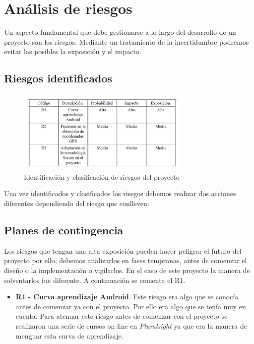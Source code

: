 \section{Análisis de riesgos}

Un aspecto fundamental que debe gestionarse a lo largo del desarrollo de un proyecto
son los riesgos. Mediante un tratamiento de la incertidumbre podremos evitar
las posibles la exposición y el impacto.

\subsection{Riesgos identificados}
\begin{figure}[H]
		\centering
		\includegraphics[width=0.75\textwidth] {riesgos.png}
		\caption{Identificación y clasificación de riesgos del proyecto }\label{fig:riesgos}
	\end{figure}
	
	
Una vez identificados y clasificados los riesgos debemos realizar dos acciones diferentes dependiendo del riesgo que conlleven:
\subsection{Planes de contingencia} 

Los riesgos que tengan una alta exposición pueden hacer peligrar el futuro del proyecto por ello,  debemos analizarlos en fases tempranas, antes
de comenzar el diseño o la implementación o vigilarlos. En el caso de este proyecto la manera de solventarlos fue diferente.  A continuación se comenta el R1.

 

\begin{itemize}
\item \textbf{R1} \textbf{- Curva aprendizaje Android}. Este riesgo era algo que se conocía antes de comenzar ya con el proyecto. Por ello era algo que se tenía  muy en cuenta. Para atenuar este riesgo antes de comenzar  con el proyecto se realizaron una serie de cursos on-line en \textit{Pluralsight} ya que era la manera de menguar esta curva de aprendizaje.






	
\end{itemize}


